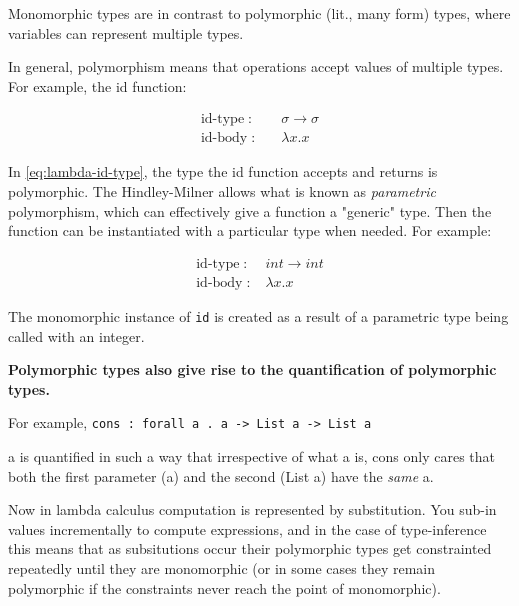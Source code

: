 \documentclass{l4proj}
\begin{document}
Monomorphic types are in contrast to polymorphic (lit., many form) types, where variables can represent multiple types.







In general, polymorphism means that operations accept values of multiple types. For example, the id function:

\begin{eqnarray} 
   \text{id-type} \; :& \; &\sigma \rightarrow \sigma \label{eq:lambda-id-type}\\
   \text{id-body} \; :& \; &\lambda x . x \label{eq:lambda-id-body}
\end{eqnarray}

In \ref{eq:lambda-id-type}, the type the id function accepts and returns is polymorphic.
The Hindley-Milner allows what is known as \emph{parametric} polymorphism, which can effectively give a function a "generic" type.
Then the function can be instantiated with a particular type when needed. 
For example:

\begin{align}\label{eq:lambda-id-instantiated} 
    \text{id-type} \; :& \; int \rightarrow int \\
    \text{id-body} \; :& \; \lambda x . x
\end{align}

The monomorphic instance of \texttt{id} is created as a result of a parametric type being called with an integer.

\textbf{Polymorphic types also give rise to the quantification of polymorphic types.}

For example, \texttt{cons : forall a . a -> List a -> List a}

a is quantified in such a way that irrespective of what a is, cons only cares that both the first parameter (a) and the second (List a) have the \emph{same} a.

Now in lambda calculus computation is represented by substitution.
You sub-in values incrementally to compute expressions, and in the case of type-inference this means that as subsitutions occur their polymorphic types get constrainted repeatedly until they are monomorphic (or in some cases they remain polymorphic if the constraints never reach the point of monomorphic).
\end{document}
